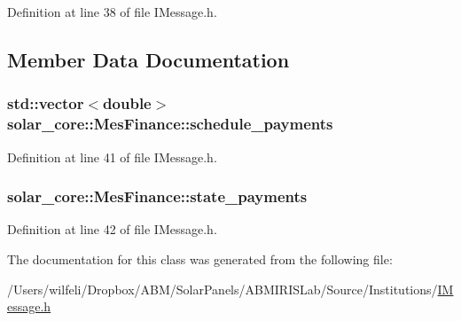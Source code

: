 Definition at line 38 of file I\+Message.\+h.



\subsection{Member Data Documentation}
\hypertarget{classsolar__core_1_1_mes_finance_aa5f0c5370821ad09da5aea0da9c03a29}{}
\subsubsection[{schedule\+\_\+payments}]{\setlength{\rightskip}{0pt plus 5cm}std\+::vector$<$double$>$ solar\+\_\+core\+::\+Mes\+Finance\+::schedule\+\_\+payments}\label{classsolar__core_1_1_mes_finance_aa5f0c5370821ad09da5aea0da9c03a29}


Definition at line 41 of file I\+Message.\+h.

\hypertarget{classsolar__core_1_1_mes_finance_a5411785779f982be49c7e14584ce2fe2}{}
\subsubsection[{state\+\_\+payments}]{ solar\+\_\+core\+::\+Mes\+Finance\+::state\+\_\+payments}\label{classsolar__core_1_1_mes_finance_a5411785779f982be49c7e14584ce2fe2}


Definition at line 42 of file I\+Message.\+h.



The documentation for this class was generated from the following file\+:\begin{DoxyCompactItemize}
\item 
/\+Users/wilfeli/\+Dropbox/\+A\+B\+M/\+Solar\+Panels/\+A\+B\+M\+I\+R\+I\+S\+Lab/\+Source/\+Institutions/\hyperlink{_i_message_8h}{I\+Message.\+h}\end{DoxyCompactItemize}
